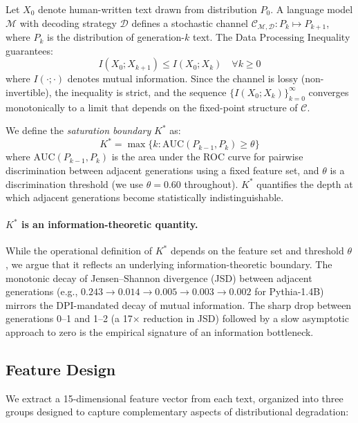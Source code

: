 \documentclass[11pt,a4paper]{article}
\begin{document}
Let $X_0$ denote human-written text drawn from distribution $P_0$. A language model $\mathcal{M}$ with decoding strategy $\mathcal{D}$ defines a stochastic channel $\mathcal{C}_{\mathcal{M},\mathcal{D}}: P_k \mapsto P_{k+1}$, where $P_k$ is the distribution of generation-$k$ text. The Data Processing Inequality guarantees:
\begin{equation}
I(X_0; X_{k+1}) \leq I(X_0; X_k) \quad \forall k \geq 0
\label{eq:dpi}
\end{equation}
where $I(\cdot;\cdot)$ denotes mutual information. Since the channel is lossy (non-invertible), the inequality is strict, and the sequence $\{I(X_0; X_k)\}_{k=0}^{\infty}$ converges monotonically to a limit that depends on the fixed-point structure of $\mathcal{C}$.

We define the \emph{saturation boundary} $K^*$ as:
\begin{equation}
K^* = \max\{k : \text{AUC}(P_{k-1}, P_k) \geq \theta\}
\label{eq:kstar}
\end{equation}
where $\text{AUC}(P_{k-1}, P_k)$ is the area under the ROC curve for pairwise discrimination between adjacent generations using a fixed feature set, and $\theta$ is a discrimination threshold (we use $\theta{=}0.60$ throughout). $K^*$ quantifies the depth at which adjacent generations become statistically indistinguishable.

\paragraph{$K^*$ is an information-theoretic quantity.}
While the operational definition of $K^*$ depends on the feature set and threshold $\theta$, we argue that it reflects an underlying information-theoretic boundary. The monotonic decay of Jensen--Shannon divergence (JSD) between adjacent generations (e.g., $0.243 \to 0.014 \to 0.005 \to 0.003 \to 0.002$ for Pythia-1.4B) mirrors the DPI-mandated decay of mutual information. The sharp drop between generations 0--1 and 1--2 (a 17$\times$ reduction in JSD) followed by a slow asymptotic approach to zero is the empirical signature of an information bottleneck.

\subsection{Feature Design}
\label{sec:features}

We extract a 15-dimensional feature vector from each text, organized into three groups designed to capture complementary aspects of distributional degradation:
\end{document}
